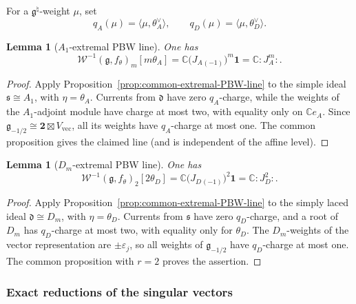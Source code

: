 \documentclass[11pt,reqno]{amsart}
\newtheorem{lemma}[theorem]{Lemma}
\theoremstyle{definition}
\theoremstyle{remark}
\begin{document}
For a \(\mathfrak g^\natural\)-weight \(\mu\), set
\begin{equation*}
  q_A(\mu)=\langle\mu,\theta_A^\vee\rangle,
  \qquad
  q_D(\mu)=\langle\mu,\theta_D^\vee\rangle.
\end{equation*}

\begin{lemma}[\(A_1\)-extremal PBW line]
\label{dl:lem:Dl-A1-extremal-PBW-line}
One has
\begin{equation*}
  \mathcal W^{-1}(\mathfrak g,f_\theta)_m[m\theta_A]
  =
  \mathbb C
  \bigl(J_A{}_{(-1)}\bigr)^m\mathbf1
  =
  \mathbb C:J_A^m:.
\end{equation*}
\end{lemma}

\begin{proof}
Apply Proposition~\ref{prop:common-extremal-PBW-line} to the simple ideal
\(\mathfrak s\cong A_1\), with \(\eta=\theta_A\).  Currents from
\(\mathfrak d\) have zero \(q_A\)-charge, while the weights of the
\(A_1\)-adjoint module have charge at most two, with equality only on
\(\mathbb Ce_A\).  Since
\(\mathfrak g_{-1/2}\cong\mathbf2\boxtimes V_{\mathrm{vec}}\), all its
weights have \(q_A\)-charge at most one.  The common proposition gives the
claimed line (and is independent of the affine level).
\end{proof}

\begin{lemma}[\(D_m\)-extremal PBW line]
\label{dl:lem:Dl-D-extremal-PBW-line}
One has
\begin{equation*}
  \mathcal W^{-1}(\mathfrak g,f_\theta)_2[2\theta_D]
  =
  \mathbb C
  \bigl(J_D{}_{(-1)}\bigr)^2\mathbf1
  =
  \mathbb C:J_D^2:.
\end{equation*}
\end{lemma}

\begin{proof}
Apply Proposition~\ref{prop:common-extremal-PBW-line} to the simply laced
ideal \(\mathfrak d\cong D_m\), with \(\eta=\theta_D\).  Currents from
\(\mathfrak s\) have zero \(q_D\)-charge, and a root of \(D_m\) has
\(q_D\)-charge at most two, with equality only for \(\theta_D\).  The
\(D_m\)-weights of the vector representation are \(\pm\varepsilon_j\), so
all weights of \(\mathfrak g_{-1/2}\) have \(q_D\)-charge at most one.
The common proposition with \(r=2\) proves the assertion.
\end{proof}

\subsubsection{Exact reductions of the singular vectors}
\end{document}

